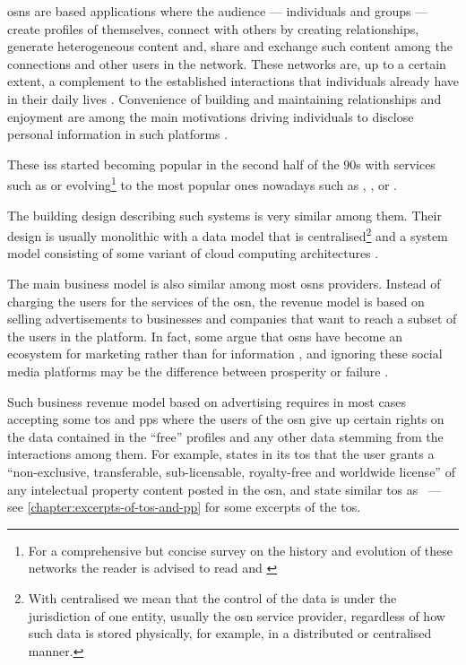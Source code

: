 \documentclass[showtrims,oldfontcommands]{kthesis}
\begin{document}
\Acp{osn} are \Internet based applications where the audience --- individuals and 
groups --- create profiles of themselves, connect with others by creating relationships, 
generate heterogeneous content and, share and exchange such content among the connections 
and other users in the network. These networks are, up to a certain extent, a complement 
to the established interactions that individuals already have in their daily lives 
\cite{SubrahmanyamRWE08}. Convenience of building and maintaining relationships 
and enjoyment are among the main motivations driving individuals to disclose personal 
information in such platforms \cite{KrasnovaSKH10}.

These \acp{is} started becoming popular in the second half of the 90s 
with services such as \LiveJournal or \Friendster evolving\footnote{For a comprehensive 
but concise survey on the history and evolution of these networks the reader is 
advised to read \cite{boydE07} and \cite{HeidemannKP12}} to the most popular ones 
nowadays such as \Facebook, \LinkedIn, \Twitter or \GooglePlus.

The building design describing such systems is very similar among them. Their design 
is usually monolithic with a data model that is centralised\footnote{With centralised 
we mean that the control of the data is under the jurisdiction of one entity, usually 
the \ac{osn} service provider, regardless of how such data is stored physically, 
for example, in a distributed or centralised manner.} and a system model consisting 
of some variant of cloud computing architectures \cite{PallisZD11}. 

The main business model is also similar among most \acp{osn} providers. Instead 
of charging the users for the services of the \ac{osn}, the revenue model is based 
on selling advertisements to businesses and companies that want to reach a subset 
of the users in the platform. In fact, some argue that \acp{osn} have become an 
ecosystem for marketing rather than for information \cite{HannaRC11}, and ignoring 
these social media platforms may be the difference between prosperity or failure 
\cite{HarrisR09}.

Such business revenue model based on advertising requires in most cases accepting 
some \ac{tos} and \acp{pp} where the users of the \ac{osn} give up certain rights 
on the data contained in the ``free'' profiles and any other data stemming from 
the interactions among them. For example, \Facebook states in its \ac{tos} that 
the user grants a ``non-exclusive, transferable, sub-licensable, royalty-free and 
worldwide license'' of any intelectual property content posted in the \ac{osn}, 
\LinkedIn and \Twitter state similar \ac{tos} as \Facebook~--- see \cref{chapter:excerpts-of-tos-and-pp} 
for some excerpts of the \ac{tos}.
\end{document}
